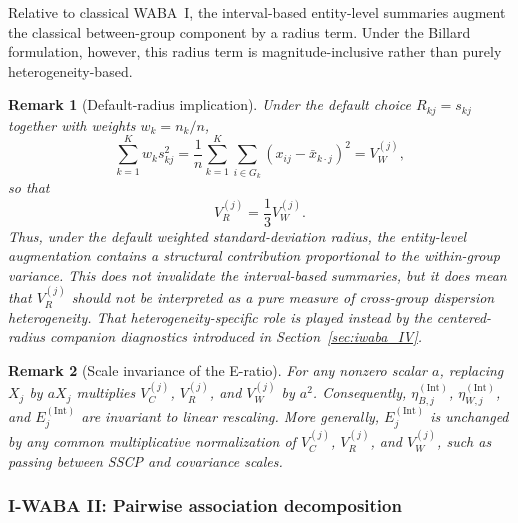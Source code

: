 \documentclass[preprint, times, 12pt, authoryear]{elsarticle}
\newtheorem{remark}{Remark}
\begin{document}
Relative to classical WABA~I, the interval-based entity-level summaries augment the classical between-group component by a radius term. Under the Billard formulation, however, this radius term is magnitude-inclusive rather than purely heterogeneity-based.

\begin{remark}[Default-radius implication]\label{rem:default_radius_entity}
	Under the default choice $R_{kj}=s_{kj}$ together with weights $w_k=n_k/n$,
	\[
	\sum_{k=1}^K w_k s_{kj}^2
	=
	\frac{1}{n}\sum_{k=1}^K\sum_{i\in G_k}(x_{ij}-\bar x_{k\cdot j})^2
	=
	V_W^{(j)},
	\]
	so that
	\[
	V_R^{(j)}=\frac{1}{3}V_W^{(j)}.
	\]
	Thus, under the default weighted standard-deviation radius, the entity-level augmentation contains a structural contribution proportional to the within-group variance. This does not invalidate the interval-based summaries, but it does mean that $V_R^{(j)}$ should not be interpreted as a pure measure of cross-group dispersion heterogeneity. That heterogeneity-specific role is played instead by the centered-radius companion diagnostics introduced in Section~\ref{sec:iwaba_IV}.
\end{remark}

\begin{remark}[Scale invariance of the E-ratio]
	For any nonzero scalar $a$, replacing $X_j$ by $aX_j$ multiplies $V_C^{(j)}$, $V_R^{(j)}$, and $V_W^{(j)}$ by $a^2$. Consequently, $\eta_{B,j}^{(\mathrm{Int})}$, $\eta_{W,j}^{(\mathrm{Int})}$, and $E_j^{(\mathrm{Int})}$ are invariant to linear rescaling. More generally, $E_j^{(\mathrm{Int})}$ is unchanged by any common multiplicative normalization of $V_C^{(j)}$, $V_R^{(j)}$, and $V_W^{(j)}$, such as passing between SSCP and covariance scales.
\end{remark}

\subsubsection{I-WABA II: Pairwise association decomposition}\label{sec:iwaba_II}
\end{document}
